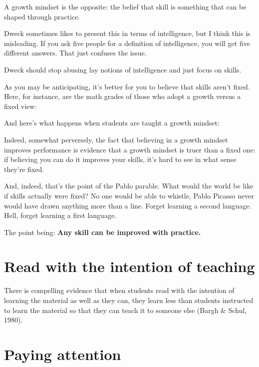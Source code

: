 A growth mindset is the opposite: the belief that skill is something that can be
shaped through practice.

Dweck sometimes likes to present this in terms of intelligence, but I think this
is misleading. If you ask five people for a definition of intelligence, you will
get five different answers. That just confuses the issue.

Dweck should stop abusing lay notions of intelligence and just focus on skills.

As you may be anticipating, it's better for you to believe that skills aren't
fixed. Here, for instance, are the math grades of those who adopt a growth
versus a fixed view:


And here's what happens when students are taught a growth mindset:


Indeed, somewhat perversely, the fact that believing in a growth mindset
improves performance is evidence that a growth mindset is truer than a fixed
one: if believing you can do it improves your skills, it's hard to see in what
sense they're fixed.

And, indeed, that's the point of the Pablo parable. What would the world be like
if skills actually were fixed? No one would be able to whistle, Pablo Picasso
never would have drawn anything more than a line. Forget learning a second
language. Hell, forget learning a first language.

The point being: \textbf{Any skill can be improved with practice.}


\section{Read with the intention of teaching}
There is compelling evidence that when students read with the intention of learning the material as well as they can, they learn less than students instructed to learn the material so that they can teach it to someone else (Bargh & Schul, 1980).

\section{Paying attention}
